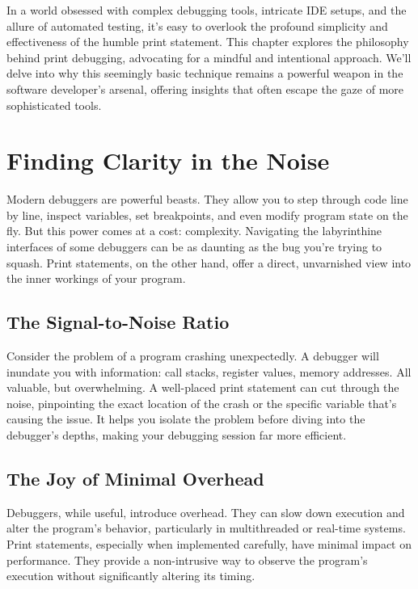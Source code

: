 \documentclass{article}
\begin{document}
In a world obsessed with complex debugging tools, intricate IDE setups, and the allure of automated testing, it's easy to overlook the profound simplicity and effectiveness of the humble print statement. This chapter explores the philosophy behind print debugging, advocating for a mindful and intentional approach. We'll delve into why this seemingly basic technique remains a powerful weapon in the software developer's arsenal, offering insights that often escape the gaze of more sophisticated tools.

\section{Finding Clarity in the Noise}

Modern debuggers are powerful beasts. They allow you to step through code line by line, inspect variables, set breakpoints, and even modify program state on the fly. But this power comes at a cost: complexity.  Navigating the labyrinthine interfaces of some debuggers can be as daunting as the bug you're trying to squash.  Print statements, on the other hand, offer a direct, unvarnished view into the inner workings of your program.

\subsection*{The Signal-to-Noise Ratio}

Consider the problem of a program crashing unexpectedly. A debugger will inundate you with information: call stacks, register values, memory addresses. All valuable, but overwhelming.  A well-placed print statement can cut through the noise, pinpointing the exact location of the crash or the specific variable that's causing the issue. It helps you isolate the problem before diving into the debugger's depths, making your debugging session far more efficient.

\subsection*{The Joy of Minimal Overhead}

Debuggers, while useful, introduce overhead.  They can slow down execution and alter the program's behavior, particularly in multithreaded or real-time systems.  Print statements, especially when implemented carefully, have minimal impact on performance. They provide a non-intrusive way to observe the program's execution without significantly altering its timing.
\end{document}
